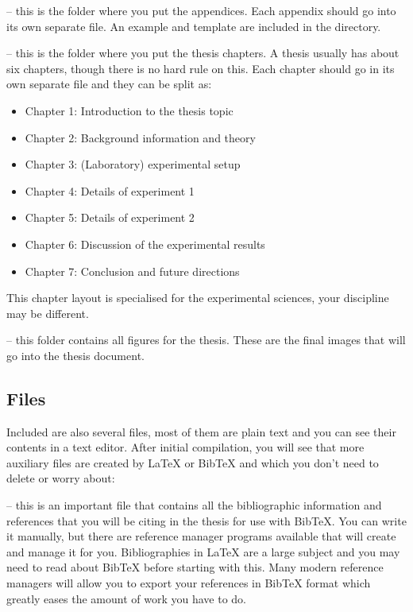  -- this is the folder where you put the appendices. Each appendix should go into its own separate  file. An example and template are included in the directory.

 -- this is the folder where you put the thesis chapters. A thesis usually has about six chapters, though there is no hard rule on this. Each chapter should go in its own separate  file and they can be split as:
\begin{itemize}
\item Chapter 1: Introduction to the thesis topic
\item Chapter 2: Background information and theory
\item Chapter 3: (Laboratory) experimental setup
\item Chapter 4: Details of experiment 1
\item Chapter 5: Details of experiment 2
\item Chapter 6: Discussion of the experimental results
\item Chapter 7: Conclusion and future directions
\end{itemize}
This chapter layout is specialised for the experimental sciences, your discipline may be different.

 -- this folder contains all figures for the thesis. These are the final images that will go into the thesis document.

\subsection{Files}

Included are also several files, most of them are plain text and you can see their contents in a text editor. After initial compilation, you will see that more auxiliary files are created by \LaTeX{} or BibTeX and which you don't need to delete or worry about:

 -- this is an important file that contains all the bibliographic information and references that you will be citing in the thesis for use with BibTeX. You can write it manually, but there are reference manager programs available that will create and manage it for you. Bibliographies in \LaTeX{} are a large subject and you may need to read about BibTeX before starting with this. Many modern reference managers will allow you to export your references in BibTeX format which greatly eases the amount of work you have to do.

